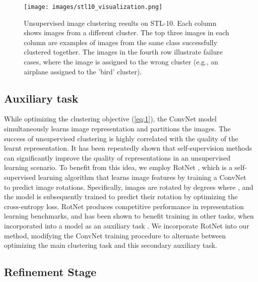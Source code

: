 \documentclass[a4paper,conference]{IEEEtran}
\begin{document}
\begin{figure*}[t]
\begin{center}
   \texttt{[image: images/stl10\_visualization.png]}
   \vspace{-.6in}
\end{center}
   \caption{Unsupervised image clustering results on STL-10. Each column shows images from a different cluster. The top three images in each column are examples of images from the same class successfully clustered together. The images in the fourth row illustrate failure cases, where the image is assigned to the wrong cluster (e.g., an airplane assigned to the 'bird' cluster).}
\label{fig:stl-10}
\end{figure*}

\subsection{Auxiliary task}

While optimizing the clustering objective (\ref{eq:1}), the ConvNet model simultaneously learns image representation and partitions the images. The success of unsupervised clustering is highly correlated with the quality of the learnt representation. It has been repeatedly shown that self-supervision methods can significantly improve the quality of representations in an unsupervised learning scenario. To benefit from this idea, we employ RotNet \cite{gidaris2018unsupervised}, which is a self-supervised learning algorithm that learns image features by training a ConvNet to predict image rotations. Specifically, images are rotated by  degrees where , and the model is subsequently trained to predict their rotation by optimizing the cross-entropy loss. RotNet produces competitive performance in representation learning benchmarks, and has been shown to benefit training in other tasks, when incorporated into a model as an auxiliary task \cite{chen2018ssgan,Gidaris2019BoostingFV,lucic2019fewlabelsgans}. We incorporate RotNet into our method, modifying the ConvNet training procedure to alternate between optimizing the main clustering task and this secondary auxiliary task.

\subsection{Refinement Stage}
\end{document}
